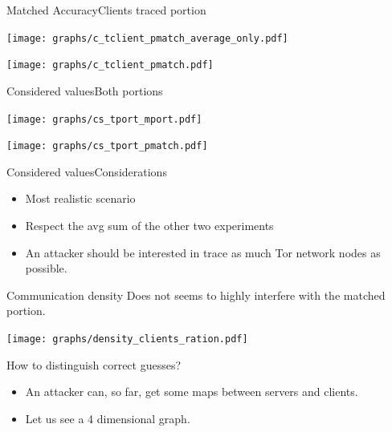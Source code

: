	\begin{frame}{Matched Accuracy}{Clients traced portion}
		\begin{minipage}{.5\textwidth}
			\texttt{[image: graphs/c\_tclient\_pmatch\_average\_only.pdf]}
		\end{minipage}
		\begin{minipage}{.4\textwidth}
			\texttt{[image: graphs/c\_tclient\_pmatch.pdf]}
		\end{minipage}
	\end{frame}

	\begin{frame}{Considered values}{Both portions}
		\begin{minipage}{.5\textwidth}
			\texttt{[image: graphs/cs\_tport\_mport.pdf]}
		\end{minipage}
		\begin{minipage}{.4\textwidth}
			\texttt{[image: graphs/cs\_tport\_pmatch.pdf]} 
		\end{minipage}
	\end{frame}

	\begin{frame}{Considered values}{Considerations}
		\begin{itemize}
			\item Most realistic scenario
			\item Respect the avg sum of the other two experiments
			\item An attacker should be interested in trace as much Tor network nodes as possible.
		\end{itemize}
	\end{frame}

	\begin{frame}{Communication density}{}
		Does not seems to highly interfere with the matched portion.
		\begin{center}
		\texttt{[image: graphs/density\_clients\_ration.pdf]}
		\end{center}
	\end{frame}

	\begin{frame}{How to distinguish correct guesses?}{}
		\begin{itemize}
			\item An attacker can, so far, get some maps between servers
			and clients.
			\item Let us see a 4 dimensional graph.
		\end{itemize}
	\end{frame}

